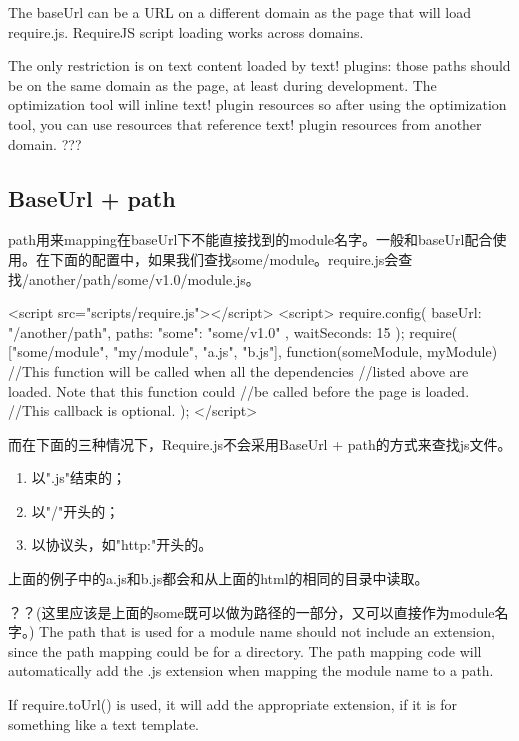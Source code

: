 The baseUrl can be a URL on a different domain as the page that will load require.js. RequireJS script loading works across domains. 

The only restriction is on text content loaded by text! plugins: those paths should be on the same domain as the page, at least during development. The optimization tool will inline text! plugin resources so after using the optimization tool, you can use resources that reference text! plugin resources from another domain. ???


\subsection{BaseUrl + path}

path用来mapping在baseUrl下不能直接找到的module名字。一般和baseUrl配合使用。在下面的配置中，如果我们查找some/module。require.js会查找/another/path/some/v1.0/module.js。


\begin{HTML5}
<script src="scripts/require.js"></script>
<script>
  require.config({
    baseUrl: "/another/path",
    paths: {
        "some": "some/v1.0"
    },
    waitSeconds: 15
  });
  require( ["some/module", "my/module", "a.js", "b.js"],
    function(someModule,    myModule) {
        //This function will be called when all the dependencies
        //listed above are loaded. Note that this function could
        //be called before the page is loaded.
        //This callback is optional.
    }
  );
</script>
\end{HTML5}

而在下面的三种情况下，Require.js不会采用BaseUrl + path的方式来查找js文件。
\begin{enumerate}
\item 以".js"结束的；
\item 以"/"开头的；
\item 以协议头，如"http:"开头的。
\end{enumerate}

上面的例子中的a.js和b.js都会和从上面的html的相同的目录中读取。



？？(这里应该是上面的some既可以做为路径的一部分，又可以直接作为module名字。)
The path that is used for a module name should not include an extension, since the path mapping could be for a directory. The path mapping code will automatically add the .js extension when mapping the module name to a path. 

 If require.toUrl() is used, it will add the appropriate extension, if it is for something like a text template.
 

